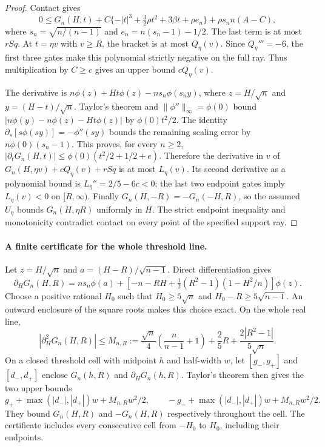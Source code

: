 \begin{proof}
Contact gives
\[
 0\le G_n(H,t)+
 C\{-|t|^3+\tfrac32\rho t^2+3\beta t+\rho e_n\}
 +\rho s_n n(A-C),
\]
where $s_n=\sqrt{n/(n-1)}$ and $e_n=n(s_n-1)-1/2$.
The last term is at most $rSq$. At $t=\eta v$ with $v\ge R$,
the bracket is at most $Q_\eta(v)$.
Since $Q_\eta'''=-6$, the first three gates make this polynomial
strictly negative on the full ray. Thus multiplication by $C\ge c$
gives an upper bound $cQ_\eta(v)$.

The derivative is
$n\phi(z)+Ht\phi(z)-ns_n\phi(s_ny)$, where
$z=H/\sqrt n$ and $y=(H-t)/\sqrt n$.
Taylor's theorem and $\|\phi''\|_\infty=\phi(0)$ bound
$|n\phi(y)-n\phi(z)-Ht\phi(z)|$ by $\phi(0)t^2/2$.
The identity $\partial_s[s\phi(sy)]=-\phi''(sy)$ bounds the
remaining scaling error by $n\phi(0)(s_n-1)$.
This proves, for every $n\ge2$,
$|\partial_tG_n(H,t)|\le\phi(0)(t^2/2+1/2+e)$.
Therefore the derivative in $v$ of
$G_n(H,\eta v)+cQ_\eta(v)+rSq$ is at most $L_\eta(v)$.
Its second derivative as a polynomial bound is
$L_\eta''=2/5-6c<0$; the last two endpoint gates imply
$L_\eta(v)<0$ on $[R,\infty)$.
Finally $G_n(H,-R)=-G_n(-H,R)$, so the assumed $U_\eta$
bounds $G_n(H,\eta R)$ uniformly in $H$.
The strict endpoint inequality and monotonicity contradict contact
on every point of the specified support ray.
\end{proof}

\paragraph{A finite certificate for the whole threshold line.}
Let $z=H/\sqrt n$ and $a=(H-R)/\sqrt{n-1}$. Direct
differentiation gives
\[
 \partial_HG_n(H,R)=ns_n\phi(a)+
 \left[-n-RH+\tfrac12(R^2-1)(1-H^2/n)\right]\phi(z).
\]
Choose a positive rational $H_0$ such that
$H_0\ge5\sqrt n$ and $H_0-R\ge5\sqrt{n-1}$.
An outward enclosure of the square roots makes this choice exact.
On the whole real line,
\[
 |\partial_H^2G_n(H,R)|\le M_{n,R}
 :=\frac{\sqrt n}{4}\left(\frac n{n-1}+1\right)
   +\frac25R+\frac{2|R^2-1|}{5\sqrt n}.
\]
On a closed threshold cell with midpoint $h$ and half-width $w$,
let $[g_-,g_+]$ and $[d_-,d_+]$ enclose $G_n(h,R)$ and
$\partial_HG_n(h,R)$. Taylor's theorem then gives the two upper
bounds
\[
 g_++\max(|d_-|,|d_+|)w+M_{n,R}w^2/2,
 \qquad
 -g_-+\max(|d_-|,|d_+|)w+M_{n,R}w^2/2.
\]
They bound $G_n(H,R)$ and $-G_n(H,R)$ respectively throughout
the cell. The certificate includes every consecutive cell from
$-H_0$ to $H_0$, including their endpoints.

